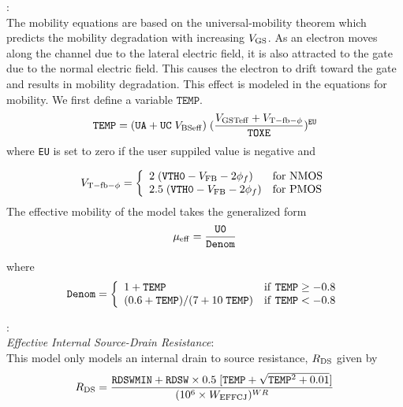 \documentclass{article}
\begin{document}
:\\
The mobility equations are based on the universal-mobility theorem
which predicts the mobility degradation with increasing
$V_{\rm{GS}}$. As an electron moves along the channel due to the
lateral electric field, it is also attracted to the gate due to
the normal electric field. This causes the electron to drift
toward the gate and results in mobility degradation. This effect
is modeled in the equations for mobility. We first define a
variable $\texttt{TEMP}$.
\begin{equation}
\texttt{TEMP} = (\texttt{UA} + \texttt{UC}\;V_{\rm{BSeff}}) \;
({V_{\rm{GSTeff}} + V_{\rm{T-fb-\phi}} \over
\texttt{TOXE}})^\texttt{EU}
\end{equation}
where \texttt{EU} is set to zero if the user suppiled value is
negative and

\begin{equation}
V_{\rm{T-fb-\phi}} = \left\{\begin{array}{ll}
       2\;(\texttt{VTH0} - V_{\rm{FB}} - 2\phi_f) & \mbox{for NMOS} \\
       2.5\;(\texttt{VTH0} - V_{\rm{FB}} - 2\phi_f) & \mbox{for PMOS}
                            \end{array}
                    \right.
\end{equation}
\noindent The effective mobility of the model takes the
generalized form
\begin{equation}
\mu_{\rm{eff}} = {\texttt{U0} \over \texttt{Denom}}
\end{equation}

where
\begin{equation}
\texttt{Denom} = \left\{\begin{array}{ll}
       1 + \texttt{TEMP}                      & \mbox{if \texttt{TEMP}} \geq -0.8 \\
       {(0.6 + \texttt{TEMP}) / (7 + 10\;\texttt{TEMP})} & \mbox{if \texttt{TEMP}} < -0.8
                            \end{array}
                    \right.
\end{equation}

:\\
{\it Effective Internal Source-Drain Resistance}:\\
This model only models an internal drain to source resistance,
$R_{\rm{DS}}$ given by
\begin{equation}
R_{\rm{DS}} = {\texttt{RDSWMIN} + \texttt{RDSW} \times
0.5\;[\texttt{TEMP} + \sqrt{\texttt{TEMP}^2 + 0.01}] \over (10^6
\times W_{\rm{EFFCJ}})^{WR}}
\end{equation}
\end{document}
